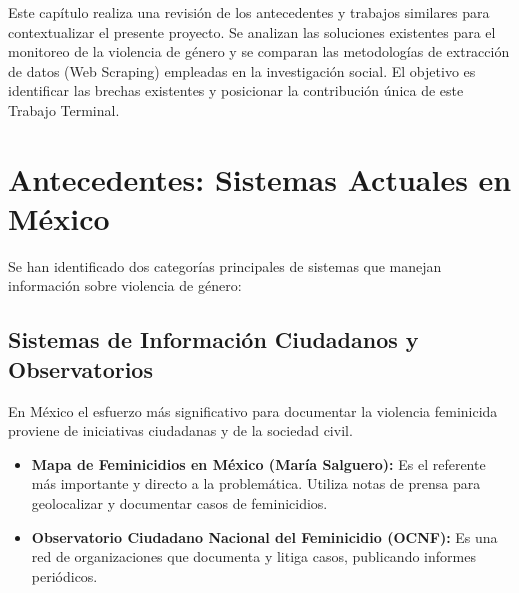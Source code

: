 ﻿%


Este capítulo realiza una revisión de los antecedentes y trabajos similares para contextualizar el presente proyecto. Se analizan las soluciones existentes para el monitoreo de la violencia de género y se comparan las metodologías de extracción de datos (Web Scraping) empleadas en la investigación social. El objetivo es identificar las brechas existentes y posicionar la contribución única de este Trabajo Terminal.

\section{Antecedentes: Sistemas Actuales en México}
\label{sec:antecedentes}

Se han identificado dos categorías principales de sistemas que manejan información sobre violencia de género:

\subsection{Sistemas de Información Ciudadanos y Observatorios}
\label{subsec:sistemas_ciudadanos}

En México el esfuerzo más significativo para documentar la violencia feminicida proviene de iniciativas ciudadanas y de la sociedad civil.

\begin{itemize}
    \item \textbf{Mapa de Feminicidios en México (María Salguero):} Es el referente más importante y directo a la problemática. Utiliza notas de prensa para geolocalizar y documentar casos de feminicidios.
    \item \textbf{Observatorio Ciudadano Nacional del Feminicidio (OCNF):} Es una red de organizaciones que documenta y litiga casos, publicando informes periódicos.
\end{itemize}

